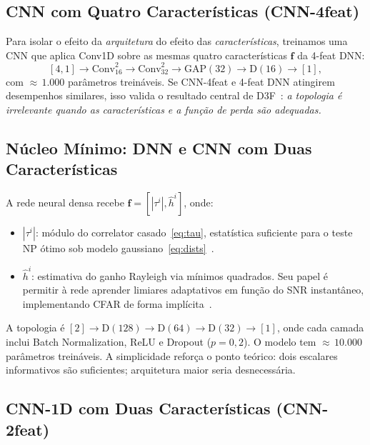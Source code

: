 \documentclass[12pt,a4paper]{article}
\begin{document}
\subsection{CNN com Quatro Características (CNN-4feat)}\label{sec:cnn4feat}

Para isolar o efeito da \emph{arquitetura} do efeito das \emph{características}, treinamos uma CNN que aplica Conv1D sobre as mesmas quatro características $\mathbf{f}$ da 4-feat DNN:
\begin{equation}\label{eq:cnn4feat}
[4,1]\!\to\!\text{Conv}_{16}^{2}\!\to\!\text{Conv}_{32}^{2}\!\to\!\text{GAP}(32)\!\to\!\text{D}(16)\!\to\![1],
\end{equation}
com ${\approx}\,1{.}000$ parâmetros treináveis. Se CNN-4feat e 4-feat DNN atingirem desempenhos similares, isso valida o resultado central de D3F~\cite{ref_braca}: \emph{a topologia é irrelevante quando as características e a função de perda são adequadas.}

\subsection{Núcleo Mínimo: DNN e CNN com Duas Características}\label{sec:dnn2feat}

A rede neural densa recebe $\mathbf{f} = [|\tau^i|, \hat{h}^i]$, onde:
\begin{itemize}
  \item \textbf{$|\tau^i|$}: módulo do correlator casado~\eqref{eq:tau}, estatística suficiente para o teste NP ótimo sob modelo gaussiano~\eqref{eq:dists}~\cite{ref_poor}.
  \item \textbf{$\hat{h}^i$}: estimativa do ganho Rayleigh via mínimos quadrados. Seu papel é permitir à rede aprender limiares adaptativos em função do SNR instantâneo, implementando CFAR de forma implícita~\cite{ref_poor}.
\end{itemize}

A topologia é $[2] \to \text{D}(128) \to \text{D}(64) \to \text{D}(32) \to [1]$, onde cada camada inclui Batch Normalization, ReLU e Dropout ($p = 0{,}2$). O modelo tem ${\approx}\,10{.}000$ parâmetros treináveis. A simplicidade reforça o ponto teórico: dois escalares informativos são suficientes; arquitetura maior seria desnecessária.

\subsection{CNN-1D com Duas Características (CNN-2feat)}\label{sec:cnn2feat}
\end{document}
